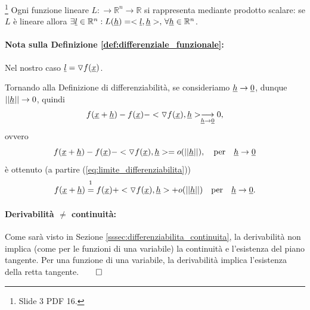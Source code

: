 \begin{definition}\footnote{Slide 3 PDF 16.}\label{def:differenziale_funzionale}
	Ogni funzione lineare $L:\rightarrow\mathbb{R}^n\rightarrow\mathbb{R}$ si rappresenta mediante prodotto scalare: se $L$ è lineare allora $\exists\uline l\in\mathbb{R}^n: L(\uline h)=<\uline l, \uline h>,\, \forall \uline h\in\mathbb{R}^n$.
\end{definition}

\paragraph{Nota sulla Definizione \ref{def:differenziale_funzionale}:} Nel nostro caso $\uline l=\triangledown f(\uline x)$.

Tornando alla Definizione di differenziabilità, se consideriamo $\uline h\rightarrow \uline0$, dunque $||\uline h||\rightarrow 0$, quindi
\begin{equation*}
	f(\uline x+\uline h) - f(\uline x) - <\triangledown f(\uline x), \uline h>\underset{\uline h\rightarrow\uline 0}{\longrightarrow} 0,
\end{equation*}
ovvero
\begin{equation}\label{eq:o_piccolo_differenziabilita}
	f(\uline x+\uline h) - f(\uline x) - <\triangledown f(\uline x), \uline h> = o(||\uline h||),\quad \text{per}\quad \uline h\rightarrow\uline 0
\end{equation}
è ottenuto (a partire (\ref{eq:limite_differenziabilita}))
\begin{equation}\label{eq:approssimazione_differenziabilita}
	f(\uline x+\uline h) \overset{\footnotemark}{=} f(\uline x) + <\triangledown f(\uline x), \uline h> + o(||\uline h||)\quad\text{per}\quad\uline h\rightarrow\uline 0.
\end{equation}

\paragraph{Derivabilità $\neq$ continuità:} Come sarà visto in Sezione \ref{sssec:differenziabilita_continuita}, la derivabilità non implica (come per le funzioni di una variabile) la continuità e l'esistenza del piano tangente. Per una funzione di una variabile, la derivabilità implica l'esistenza della retta tangente.$\qed$

